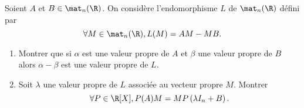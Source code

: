 \begin{enonce}
\begin{exercise}[ID={RMS127 E1015},subtitle={Centrale PSI 2016},tags={}, difficulty={0}]
  Soient $A$ et $B\in\mat_n(\R)$.
  On considère l'endomorphisme $L$ de $\mat_n(\R)$ défini par
  \begin{equation*}
    \forall M\in\mat_n(\R), L(M) = AM - MB.
  \end{equation*}

  \begin{enumerate}
    \item Montrer que si $\alpha$ est une valeur propre de $A$ et $\beta$ une valeur propre de $B$ alors $\alpha-\beta$ est une valeur propre de $L$.

    \item Soit $\lambda$ une valeur propre de $L$ associée au vecteur propre $M$.
      Montrer
      \begin{equation*}
        \forall P\in\R[X], P(A) M = M P\left( \lambda I_n + B \right).
      \end{equation*}
  \end{enumerate}
\end{exercise}
\begin{solution}
\end{solution}
\end{enonce}
